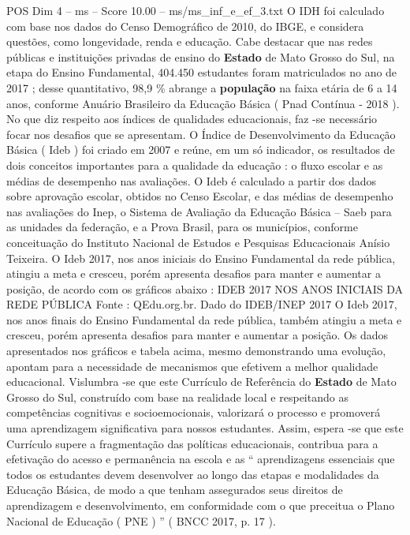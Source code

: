 \begin{textsample}{POS Dim 4 – ms – Score 10.00 – ms/ms\_inf\_e\_ef\_3.txt}
O IDH foi calculado com base nos dados do Censo Demográfico de 2010, do IBGE, e considera questões, como longevidade, renda e educação.
Cabe destacar que nas redes públicas e instituições privadas de ensino do \textbf{Estado} de Mato Grosso do Sul, na etapa do Ensino Fundamental, 404.450 estudantes foram matriculados no ano de 2017 ; desse quantitativo, 98,9 \% abrange a \textbf{população} na faixa etária de 6 a 14 anos, conforme Anuário Brasileiro da Educação Básica ( Pnad Contínua - 2018 ).
No que diz respeito aos índices de qualidades educacionais, faz -se necessário focar nos desafios que se apresentam.
O Índice de Desenvolvimento da Educação Básica ( Ideb ) foi criado em 2007 e reúne, em um só indicador, os resultados de dois conceitos importantes para a qualidade da educação : o fluxo escolar e as médias de desempenho nas avaliações.
O Ideb é calculado a partir dos dados sobre aprovação escolar, obtidos no Censo Escolar, e das médias de desempenho nas avaliações do Inep, o Sistema de Avaliação da Educação Básica – Saeb para as unidades da federação, e a Prova Brasil, para os municípios, conforme conceituação do Instituto Nacional de Estudos e Pesquisas Educacionais Anísio Teixeira.
O Ideb 2017, nos anos iniciais do Ensino Fundamental da rede pública, atingiu a meta e cresceu, porém apresenta desafios para manter e aumentar a posição, de acordo com os gráficos abaixo : IDEB 2017 NOS ANOS INICIAIS DA REDE PÚBLICA Fonte : QEdu.org.br.
Dado do IDEB/INEP 2017 O Ideb 2017, nos anos finais do Ensino Fundamental da rede pública, também atingiu a meta e cresceu, porém apresenta desafios para manter e aumentar a posição.
Os dados apresentados nos gráficos e tabela acima, mesmo demonstrando uma evolução, apontam para a necessidade de mecanismos que efetivem a melhor qualidade educacional.
Vislumbra -se que este Currículo de Referência do \textbf{Estado} de Mato Grosso do Sul, construído com base na realidade local e respeitando as competências cognitivas e socioemocionais, valorizará o processo e promoverá uma aprendizagem significativa para nossos estudantes.
Assim, espera -se que este Currículo supere a fragmentação das políticas educacionais, contribua para a efetivação do acesso e permanência na escola e as “ aprendizagens essenciais que todos os estudantes devem desenvolver ao longo das etapas e modalidades da Educação Básica, de modo a que tenham assegurados seus direitos de aprendizagem e desenvolvimento, em conformidade com o que preceitua o Plano Nacional de Educação ( PNE ) ” ( BNCC 2017, p. 17 ).

\end{textsample}
